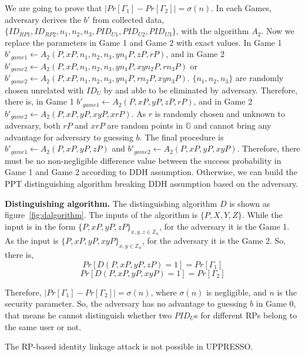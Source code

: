 We are going to prove that $|Pr[\Gamma_1]-Pr[\Gamma_2]|=\sigma(n)$. In each Games, adversary derives the $b'$ from collected data, $\{ID_{RP1},ID_{RP2},n_1,n_2,n_3,PID_{U1},PID_{U2},PID_{U3}\}$, with the algorithm $A_2$. Now we replace the parameters in Game 1 and Game 2 with exact values. In Game 1 $b'_{game1}\gets A_2(P,xP,n_1,n_2,n_3,yn_1P,zP,rP)$, and in Game 2 $b'_{game2}\gets A_2(P,xP,n_1,n_2,n_3,yn_1P,xyn_2P,rn_3P)$ or $b'_{game2}\gets A_2(P,xP,n_1,n_2,n_3,yn_1P,rn_2P,xyn_3P)$. $\{n_1,n_2,n_3\}$ are randomly chosen unrelated with $ID_U$ by  and able to be eliminated by adversary. Therefore, there is, in Game 1 $b'_{game1}\gets A_2(P,xP,yP,zP,rP)$, and in Game 2 $b'_{game2}\gets A_2(P,xP,yP,xyP,xrP)$. As $r$ is randomly chosen and unknown to adversary, both $rP$ and $xrP$ are random points in $\mathbb{G}$ and cannot bring any advantage for adversary to guessing $b$.  The final procedure is $b'_{game1}\gets A_2(P,xP,yP,zP)$ and $b'_{game2}\gets A_2(P,xP,yP,xyP)$. Therefore, there must be no non-negligible difference value between the success probability in Game 1 and Game 2 according to DDH assumption. Otherwise, we can build the PPT distinguishing algorithm breaking DDH assumption based on the adversary. 

\noindent\textbf{Distinguishing algorithm.} The distinguishing algorithm $D$ is shown as figure~\ref{fig:dalgorithm}. 
The inputs of the algorithm is $\{P,X,Y,Z\}$. While the input is in the form $\{P,xP,yP,zP\}_{x,y,z \in \mathbb{Z}_n}$, for the adversary it is the Game 1. As the input is $\{P,xP,yP,xyP\}_{x,y \in \mathbb{Z}_n}$, for the adversary it is the Game 2. So, there is,
\begin{equation*}
   Pr[D(P,xP,yP,zP)=1]=Pr[{\Gamma_1}]
\end{equation*}
\begin{equation*}
   Pr[D(P,xP,yP,xyP)=1]=Pr[{\Gamma_2}]
\end{equation*}

Therefore, $|Pr[\Gamma_1]-Pr[\Gamma_2]|=\sigma(n)$, where $\sigma(n)$ is negligible, and $n$ is the security parameter. So, the adversary has no advantage to guessing $b$ in Game 0, that means he cannot distinguish whether two $PID_U$s for different RPs belong to the same user or not. 

The RP-based identity linkage attack is not possible in UPPRESSO.


